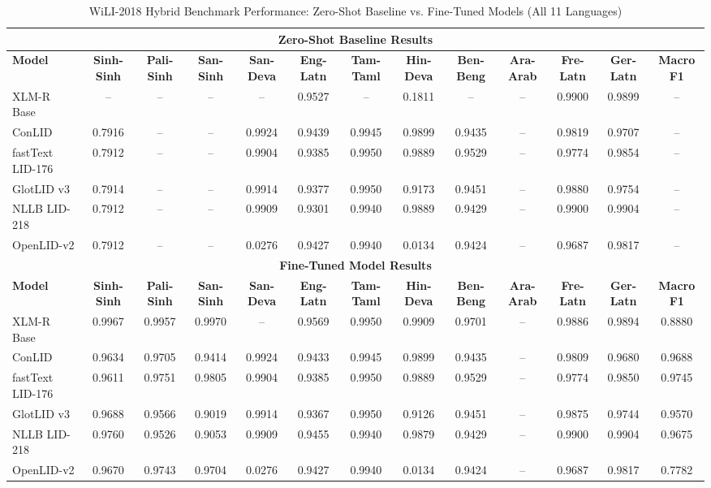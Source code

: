 \documentclass[conference]{IEEEtran}
\begin{document}
\begin{table}[p]
\vspace{10pt}

\caption{WiLI-2018 Hybrid Benchmark Performance: Zero-Shot Baseline vs. Fine-Tuned Models (All 11 Languages)}
\label{tab:wili_full}
\begin{tabular}{l ccc cccccccc c}
\toprule
\multicolumn{13}{c}{\textbf{Zero-Shot Baseline Results}} \\
\midrule
\textbf{Model} & \textbf{Sinh-Sinh} & \textbf{Pali-Sinh} & \textbf{San-Sinh} & \textbf{San-Deva} & \textbf{Eng-Latn} & \textbf{Tam-Taml} & \textbf{Hin-Deva} & \textbf{Ben-Beng} & \textbf{Ara-Arab} & \textbf{Fre-Latn} & \textbf{Ger-Latn} & \textbf{Macro F1} \\
\midrule
XLM-R Base & -- & -- & -- & -- & 0.9527 & -- & 0.1811 & -- & -- & 0.9900 & 0.9899 & -- \\
ConLID & 0.7916 & -- & -- & 0.9924 & 0.9439 & 0.9945 & 0.9899 & 0.9435 & -- & 0.9819 & 0.9707 & -- \\
fastText LID-176 & 0.7912 & -- & -- & 0.9904 & 0.9385 & 0.9950 & 0.9889 & 0.9529 & -- & 0.9774 & 0.9854 & -- \\
GlotLID v3 & 0.7914 & -- & -- & 0.9914 & 0.9377 & 0.9950 & 0.9173 & 0.9451 & -- & 0.9880 & 0.9754 & -- \\
NLLB LID-218 & 0.7912 & -- & -- & 0.9909 & 0.9301 & 0.9940 & 0.9889 & 0.9429 & -- & 0.9900 & 0.9904 & -- \\
OpenLID-v2 & 0.7912 & -- & -- & 0.0276 & 0.9427 & 0.9940 & 0.0134 & 0.9424 & -- & 0.9687 & 0.9817 & -- \\
\midrule
\multicolumn{13}{c}{\textbf{Fine-Tuned Model Results}} \\
\midrule
\textbf{Model} & \textbf{Sinh-Sinh} & \textbf{Pali-Sinh} & \textbf{San-Sinh} & \textbf{San-Deva} & \textbf{Eng-Latn} & \textbf{Tam-Taml} & \textbf{Hin-Deva} & \textbf{Ben-Beng} & \textbf{Ara-Arab} & \textbf{Fre-Latn} & \textbf{Ger-Latn} & \textbf{Macro F1} \\
\midrule
XLM-R Base & 0.9967 & 0.9957 & 0.9970 & -- & 0.9569 & 0.9950 & 0.9909 & 0.9701 & -- & 0.9886 & 0.9894 & 0.8880 \\
ConLID & 0.9634 & 0.9705 & 0.9414 & 0.9924 & 0.9433 & 0.9945 & 0.9899 & 0.9435 & -- & 0.9809 & 0.9680 & 0.9688 \\
fastText LID-176 & 0.9611 & 0.9751 & 0.9805 & 0.9904 & 0.9385 & 0.9950 & 0.9889 & 0.9529 & -- & 0.9774 & 0.9850 & 0.9745 \\
GlotLID v3 & 0.9688 & 0.9566 & 0.9019 & 0.9914 & 0.9367 & 0.9950 & 0.9126 & 0.9451 & -- & 0.9875 & 0.9744 & 0.9570 \\
NLLB LID-218 & 0.9760 & 0.9526 & 0.9053 & 0.9909 & 0.9455 & 0.9940 & 0.9879 & 0.9429 & -- & 0.9900 & 0.9904 & 0.9675 \\
OpenLID-v2 & 0.9670 & 0.9743 & 0.9704 & 0.0276 & 0.9427 & 0.9940 & 0.0134 & 0.9424 & -- & 0.9687 & 0.9817 & 0.7782 \\
\bottomrule
\end{tabular}
\end{table}
\end{document}
